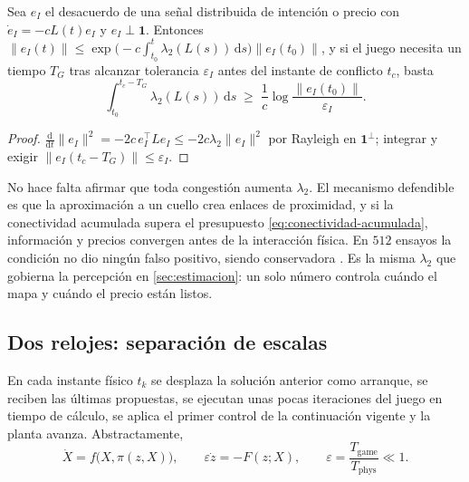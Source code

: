 \begin{proposicion}
\label{pr:conectividad-acumulada}
Sea $e_I$ el desacuerdo de una señal distribuida de intención o precio con
$\dot e_I=-cL(t)e_I$ y $e_I\perp\mathbf 1$. Entonces
$\lVert e_I(t)\rVert\le\exp\bigl(-c\int_{t_0}^{t}\lambda_2(L(s))\,\mathrm ds\bigr)\lVert e_I(t_0)\rVert$,
y si el juego necesita un tiempo $T_G$ tras alcanzar tolerancia $\varepsilon_I$
antes del instante de conflicto $t_c$, basta
\begin{equation}
  \label{eq:conectividad-acumulada}
  \int_{t_0}^{t_c-T_G}\lambda_2(L(s))\,\mathrm ds\;\ge\;\frac1c\log\frac{\lVert e_I(t_0)\rVert}{\varepsilon_I}.
\end{equation}
\end{proposicion}

\begin{proof}
$\tfrac{\mathrm d}{\mathrm dt}\lVert e_I\rVert^2=-2c\,e_I^{\!\top}L e_I\le-2c\lambda_2\lVert e_I\rVert^2$
por Rayleigh en $\mathbf 1^\perp$; integrar y exigir
$\lVert e_I(t_c-T_G)\rVert\le\varepsilon_I$.
\end{proof}

\begin{observacion}
\label{obs:conectividad-mecanismo}
No hace falta afirmar que toda congestión aumenta $\lambda_2$. El mecanismo
defendible es que la aproximación a un cuello crea enlaces de proximidad, y
si la conectividad acumulada supera el presupuesto
\eqref{eq:conectividad-acumulada}, información y precios convergen antes de la
interacción física. En $512$ ensayos la condición no dio ningún falso positivo,
siendo conservadora \cite{mayorga2026compendio}. Es la misma $\lambda_2$ que
gobierna la percepción en \cref{sec:estimacion}: un solo número controla
cuándo el mapa y cuándo el precio están listos.
\end{observacion}

\subsection{Dos relojes: separación de escalas}

En cada instante físico $t_k$ se desplaza la solución anterior como arranque,
se reciben las últimas propuestas, se ejecutan unas pocas iteraciones del
juego en tiempo de cálculo, se aplica el primer control de la continuación
vigente y la planta avanza. Abstractamente,
\begin{equation}
  \label{eq:perturbacion-singular}
  \dot X=f\bigl(X,\pi(z,X)\bigr),\qquad \varepsilon\dot z=-F(z;X),\qquad
  \varepsilon=\frac{T_{\mathrm{game}}}{T_{\mathrm{phys}}}\ll1 .
\end{equation}

